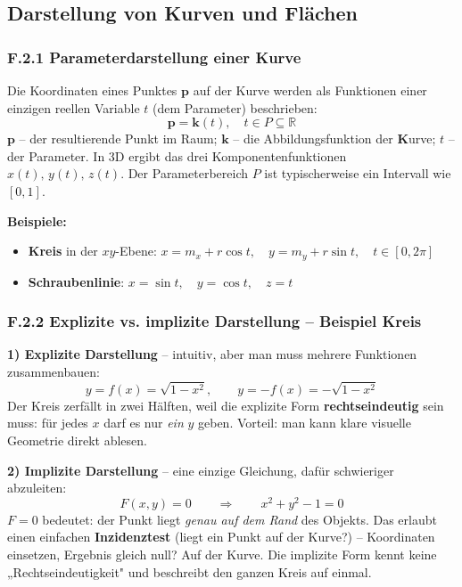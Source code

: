 \documentclass[12pt, a4paper]{article}
\begin{document}
\subsection{Darstellung von Kurven und Flächen}

\subsubsection*{F.2.1 Parameterdarstellung einer Kurve}

Die Koordinaten eines Punktes $\mathbf{p}$ auf der Kurve werden als Funktionen einer einzigen reellen Variable $t$ (dem Parameter) beschrieben:
\[
  \mathbf{p} = \mathbf{k}(t), \quad t \in P \subseteq \mathbb{R}
\]
$\mathbf{p}$ -- der resultierende Punkt im Raum; $\mathbf{k}$ -- die Abbildungsfunktion der \textbf{K}urve; $t$ -- der Parameter. In 3D ergibt das drei Komponentenfunktionen $x(t),\, y(t),\, z(t)$. Der Parameterbereich $P$ ist typischerweise ein Intervall wie $[0,1]$.

\textbf{Beispiele:}
\begin{itemize}
  \item \textbf{Kreis} in der $xy$-Ebene: $x = m_x + r\cos t,\quad y = m_y + r\sin t,\quad t \in [0, 2\pi]$
  \item \textbf{Schraubenlinie}: $x = \sin t,\quad y = \cos t,\quad z = t$
\end{itemize}

\subsubsection*{F.2.2 Explizite vs. implizite Darstellung -- Beispiel Kreis}

\textbf{1) Explizite Darstellung} -- intuitiv, aber man muss mehrere Funktionen zusammenbauen:
\[
  y = f(x) = \sqrt{1 - x^2}, \qquad y = -f(x) = -\sqrt{1 - x^2}
\]
Der Kreis zerfällt in zwei Hälften, weil die explizite Form \textbf{rechtseindeutig} sein muss: für jedes $x$ darf es nur \textit{ein} $y$ geben. Vorteil: man kann klare visuelle Geometrie direkt ablesen.

\textbf{2) Implizite Darstellung} -- eine einzige Gleichung, dafür schwieriger abzuleiten:
\[
  F(x, y) = 0 \qquad \Rightarrow \qquad x^2 + y^2 - 1 = 0
\]
$F = 0$ bedeutet: der Punkt liegt \textit{genau auf dem Rand} des Objekts. Das erlaubt einen einfachen \textbf{Inzidenztest} (liegt ein Punkt auf der Kurve?) -- Koordinaten einsetzen, Ergebnis gleich null? Auf der Kurve. Die implizite Form kennt keine „Rechtseindeutigkeit" und beschreibt den ganzen Kreis auf einmal.
\end{document}
